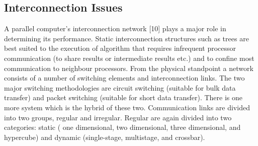 \subsection{Interconnection Issues}
A parallel computer's interconnection network [10] plays a major role in determining its performance. Static interconnection structures such as trees are best
suited to the execution of algorithm that requires infrequent processor communication (to share results or intermediate results etc.) and to confine most
communication to neighbour processors. From the physical standpoint a network consists of a number of switching elements and interconnection links. The two
major switching methodologies are circuit switching (suitable for bulk data transfer) and packet switching (suitable for short data transfer). There is one
more system which is the hybrid of these two. Communication links are divided into two groups, regular and irregular. Regular are again divided into two
categories: static ( one dimensional, two dimensional, three dimensional, and hypercube)  and dynamic (single-stage, multistage, and crossbar).

